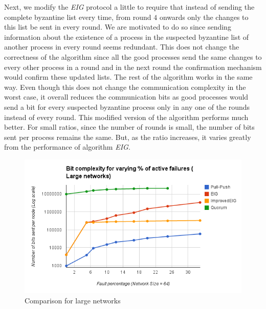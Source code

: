         Next, we modify the \textit{EIG} protocol a little to require that instead of sending the complete byzantine list every time, from round $4$ onwards only the changes to this list be sent in every round. We are motivated to do so since sending information about the existence of a process in the suspected byzantine list of another process in every round seems redundant. This does not change the correctness of the algorithm since all the good processes send the same changes to every other process in a round and in the next round the confirmation mechanism would confirm these updated lists. The rest of the algorithm works in the same way. Even though this does not change the communication complexity in the worst case, it overall reduces the communication bits as good processes would send a bit for every suspected byzantine process only in any one of the rounds instead of every round. This modified version of the algorithm performs much better. For small ratios, since the number of rounds is small, the number of bits sent per process remains the same. But, as the ratio increases, it varies greatly from the performance of algorithm \textit{EIG}.
\begin{figure}[ht]
 \centering
\vspace{-1mm}
\includegraphics[scale=0.4]{LargeNetBit}
\vspace{-1mm}
\caption{Comparison for large networks}
 \label{fig:comp}
\vspace{-4mm}
\end{figure}


